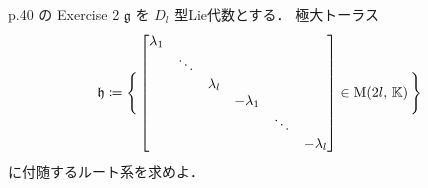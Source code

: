 \documentclass{ltjsarticle}
\theoremstyle{mystyle} %
\numberwithin{equation}{section}
\begin{document}

\begin{myproblem}[label=ex:2-8-2D]{p.40 の Exercise 2}
    $\mathfrak{g}$ を $D_l$ 型Lie代数とする．
    極大トーラス
    \begin{align}
        \mathfrak{h} \coloneqq \Biggl\{\, \mqty[\dmat{\lambda_1,\ddots,\lambda_{l},-\lambda_{1},\ddots,-\lambda_{l}}] \in \Mat{2l}{\mathbb{K}} \,\Biggr\} 
    \end{align}
    に付随するルート系を求めよ．
\end{myproblem}
\end{document}
